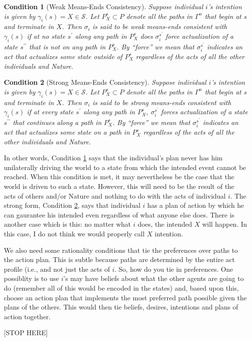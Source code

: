 \documentclass[
11pt,
titlepage,
reqno,
]{article}%
\newtheorem{condition}{Condition}
\theoremstyle{definition}
\begin{document}
	\begin{condition}[Weak Means-Ends Consistency]\label{cond:weak M-E}
		Suppose individual $i$'s intention is given by $\gamma_i(s)=X\in\mathcal{S}$. 
		Let $P^s_X\subset P$ denote all the paths in $\Gamma^n$ that begin at $s$ and terminate in $X$. 
		Then $\sigma_i$ is said to be \textit{weak means-ends consistent with $\gamma_i(s)$} if at no state $s^\prime$ along any path in $P^s_X$ does $\sigma_i^{s^\prime}$ force actualization of a state $s^{\prime\prime}$ that is not on any path in $P^s_X$. 
		By ``force'' we mean that $\sigma_i^{s^\prime}$ indicates an act that actualizes some state outside of $P^s_X$ regardless of the acts of all the other individuals and Nature. 
	\end{condition}
	
	\begin{condition}[Strong Means-Ends Consistency]\label{cond:strong M-E}
		Suppose individual $i$'s intention is given by $\gamma_i(s)=X\in\mathcal{S}$. 
		Let $P^s_X\subset P$ denote all the paths in $\Gamma^n$ that begin at $s$ and terminate in $X$. 
		Then $\sigma_i$ is said to be \textit{strong means-ends consistent with $\gamma_i(s)$} if at every state $s^\prime$ along any path in $P^s_X$,  $\sigma_i^{s^\prime}$ forces actualization of a state $s^{\prime\prime}$ that continues along a path in $P^s_X$. 
		By ``force'' we mean that $\sigma_i^{s^\prime}$ indicates an act that actualizes some state on a path in $P^s_X$ regardless of the acts of all the other individuals and Nature. 
	\end{condition}
	
	In other words, Condition \ref{cond:weak M-E} says that the individual's plan never has him unilaterally driving the world to a state from which the intended event cannot be reached. 
	When this condition is met, it may nevertheless be the case that the world is driven to such a state. 
	However, this will need to be the result of the acts of others and/or Nature and nothing to do with the acts of individual $i$. 
	The strong form, Condition \ref{cond:strong M-E}, says that individual $i$ has a plan of action by which he can gaurantee his intended even regardless of what anyone else does.
	There is another case which is this: no matter what $i$ does, the intended $X$ will happen. 
	In this case, I do not think we would properly call $X$ intention. 
	
	We also need some rationality conditions that tie the preferences over paths to the action plan. 
	This is subtle because paths are determined by the entire act profile (i.e., and not just the acts of $i$. 
	So, how do you tie in preferences. One possiblity is to use $i$'s may have beliefs about what the other agents are going to do (remember all of this would be encoded in the states) and, based upon this, choose an action plan that implements the most preferred path possible given the plans of the others. 
	This would then tie beliefs, desires, intentions and plans of action together. 
	
	
	[STOP HERE]
	
	
	
	
\end{document}
